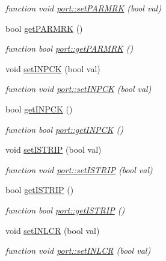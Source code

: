 \begin{DoxyCompactItemize}
\begin{DoxyCompactList}\small\item\em function void \hyperlink{classport_a82283d6d16531d32b6a41e00b81b6c02}{port\+::set\+P\+A\+R\+M\+RK} (bool val) \end{DoxyCompactList}\item 
bool \hyperlink{classport_a92d004da4e55ba28f1bef98a92a3db29}{get\+P\+A\+R\+M\+RK} ()
\begin{DoxyCompactList}\small\item\em function bool \hyperlink{classport_a92d004da4e55ba28f1bef98a92a3db29}{port\+::get\+P\+A\+R\+M\+RK} () \end{DoxyCompactList}\item 
void \hyperlink{classport_ad021eae5176782417807c3788ae2235e}{set\+I\+N\+P\+CK} (bool val)
\begin{DoxyCompactList}\small\item\em function void \hyperlink{classport_ad021eae5176782417807c3788ae2235e}{port\+::set\+I\+N\+P\+CK} (bool val) \end{DoxyCompactList}\item 
bool \hyperlink{classport_a4699e4d4d41fbafc84283aec74033332}{get\+I\+N\+P\+CK} ()
\begin{DoxyCompactList}\small\item\em function bool \hyperlink{classport_a4699e4d4d41fbafc84283aec74033332}{port\+::get\+I\+N\+P\+CK} () \end{DoxyCompactList}\item 
void \hyperlink{classport_ab9f983c471a53c5646d45038a4336302}{set\+I\+S\+T\+R\+IP} (bool val)
\begin{DoxyCompactList}\small\item\em function void \hyperlink{classport_ab9f983c471a53c5646d45038a4336302}{port\+::set\+I\+S\+T\+R\+IP} (bool val) \end{DoxyCompactList}\item 
bool \hyperlink{classport_a0dc8e00aedf6ddc490addefd1a780f54}{get\+I\+S\+T\+R\+IP} ()
\begin{DoxyCompactList}\small\item\em function bool \hyperlink{classport_a0dc8e00aedf6ddc490addefd1a780f54}{port\+::get\+I\+S\+T\+R\+IP} () \end{DoxyCompactList}\item 
void \hyperlink{classport_a548740957c8a76fbc143b000a999539c}{set\+I\+N\+L\+CR} (bool val)
\begin{DoxyCompactList}\small\item\em function void \hyperlink{classport_a548740957c8a76fbc143b000a999539c}{port\+::set\+I\+N\+L\+CR} (bool val) \end{DoxyCompactList}\item 

\end{DoxyCompactItemize}
